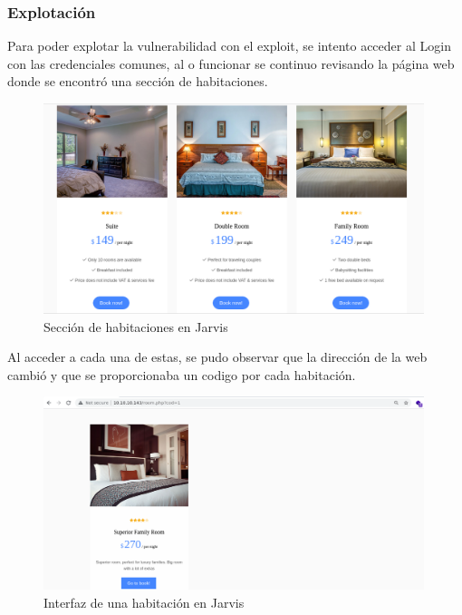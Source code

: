     \subsubsection{Explotación}

        \large{Para poder explotar la vulnerabilidad con el exploit, se intento acceder al Login con las credenciales comunes, al o funcionar se continuo revisando la página web donde se encontró una sección de habitaciones.}
        \par
        \begin{figure}[H]
            \centering
            \includegraphics[width=0.99\textwidth]{imagenes/jarvis/06_seccion_rooms_jarvis.png}
            \caption{Sección de habitaciones en Jarvis}
        \end{figure}

        \large{Al acceder a cada una de estas, se pudo observar que la dirección de la web cambió y que se proporcionaba un codigo por cada habitación.}
        \par
        \begin{figure}[H]
            \centering
            \includegraphics[width=0.99\textwidth]{imagenes/jarvis/07_room_jarvis.png}
            \caption{Interfaz de una habitación en Jarvis}
        \end{figure}

